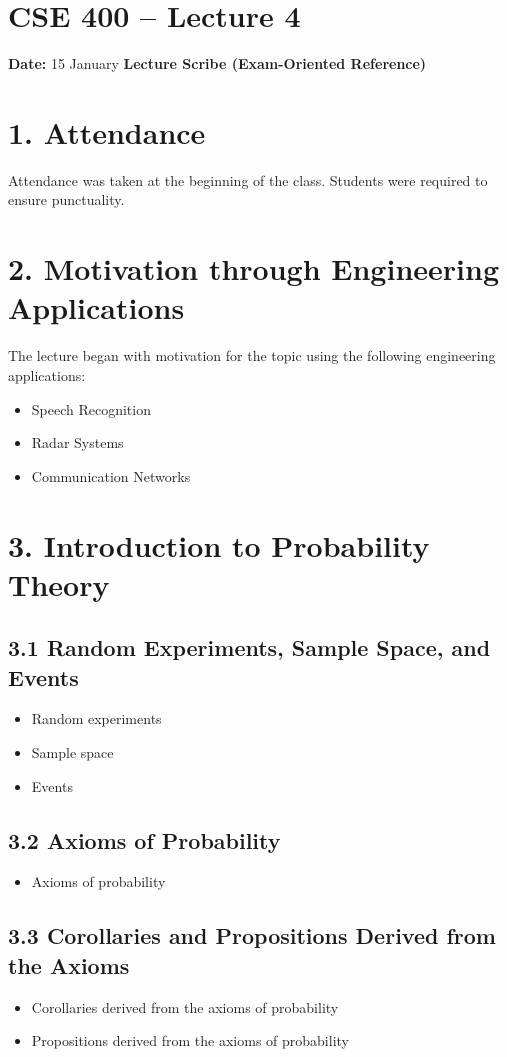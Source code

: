 \documentclass[12pt]{article}
\begin{document}
\section*{CSE 400 -- Lecture 4}

\textbf{Date:} 15 January  
\textbf{Lecture Scribe (Exam-Oriented Reference)}

\section*{1. Attendance}
Attendance was taken at the beginning of the class.  
Students were required to ensure punctuality.

\section*{2. Motivation through Engineering Applications}
The lecture began with motivation for the topic using the following engineering applications:

\begin{itemize}
\item Speech Recognition
\item Radar Systems
\item Communication Networks
\end{itemize}

\section*{3. Introduction to Probability Theory}

\subsection*{3.1 Random Experiments, Sample Space, and Events}
\begin{itemize}
\item Random experiments
\item Sample space
\item Events
\end{itemize}

\subsection*{3.2 Axioms of Probability}
\begin{itemize}
\item Axioms of probability
\end{itemize}

\subsection*{3.3 Corollaries and Propositions Derived from the Axioms}
\begin{itemize}
\item Corollaries derived from the axioms of probability
\item Propositions derived from the axioms of probability
\end{itemize}
\end{document}

